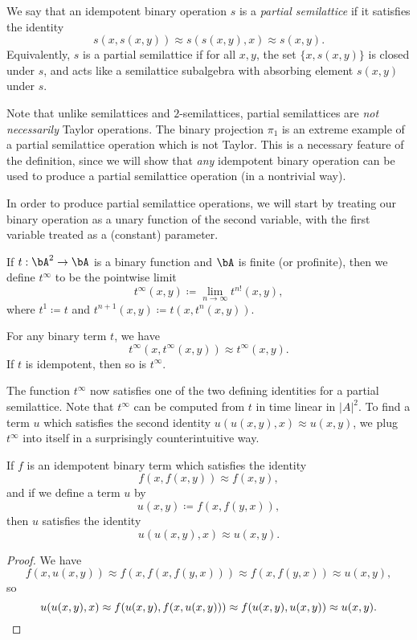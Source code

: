 \begin{defn} We say that an idempotent binary operation $s$ is a \emph{partial semilattice} if it satisfies the identity
\[
s(x,s(x,y)) \approx s(s(x,y),x) \approx s(x,y).
\]
Equivalently, $s$ is a partial semilattice if for all $x,y$, the set $\{x,s(x,y)\}$ is closed under $s$, and acts like a semilattice subalgebra with absorbing element $s(x,y)$ under $s$.
\end{defn}

Note that unlike semilattices and $2$-semilattices, partial semilattices are \emph{not necessarily} Taylor operations. The binary projection $\pi_1$ is an extreme example of a partial semilattice operation which is not Taylor. This is a necessary feature of the definition, since we will show that \emph{any} idempotent binary operation can be used to produce a partial semilattice operation (in a nontrivial way).

In order to produce partial semilattice operations, we will start by treating our binary operation as a unary function of the second variable, with the first variable treated as a (constant) parameter.

\begin{defn} If $t : \bA^2 \rightarrow \bA$ is a binary function and $\bA$ is finite (or profinite), then we define $t^\infty$ to be the pointwise limit
\[
t^\infty(x,y) \coloneqq \lim_{n \rightarrow \infty} t^{n!}(x,y),
\]
where $t^1 \coloneqq t$ and $t^{n+1}(x,y) \coloneqq t(x,t^n(x,y))$.
\end{defn}

\begin{prop} For any binary term $t$, we have
\[
t^\infty(x,t^\infty(x,y)) \approx t^\infty(x,y).
\]
If $t$ is idempotent, then so is $t^\infty$.
\end{prop}

The function $t^\infty$ now satisfies one of the two defining identities for a partial semilattice. Note that $t^\infty$ can be computed from $t$ in time linear in $|A|^2$. To find a term $u$ which satisfies the second identity $u(u(x,y),x) \approx u(x,y)$, we plug $t^\infty$ into itself in a surprisingly counterintuitive way.

\begin{prop} If $f$ is an idempotent binary term which satisfies the identity
\[
f(x,f(x,y)) \approx f(x,y),
\]
and if we define a term $u$ by
\[
u(x,y) \coloneqq f(x,f(y,x)),
\]
then $u$ satisfies the identity
\[
u(u(x,y),x) \approx u(x,y).
\]
\end{prop}
\begin{proof}
We have
\[
f(x,u(x,y)) \approx f(x,f(x,f(y,x))) \approx f(x,f(y,x)) \approx u(x,y),
\]
so
\[
u(u(x,y),x) \approx f(u(x,y),f(x,u(x,y))) \approx f(u(x,y),u(x,y)) \approx u(x,y).\qedhere
\]
\end{proof}

